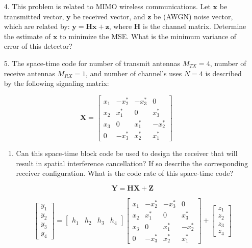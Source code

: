 \documentclass[fleqn]{article}
\makeatletter
\newenvironment{equationCenter}{\@fleqnfalse\begin{equation*}}{\end{equation*}}
\makeatother
\begin{document}
\begin{enumerate}
		\item[4.] This problem is related to MIMO wireless communications. Let $\mathbf{x}$ be transmitted vector, $\mathbf{y}$ be received vector, and $\mathbf{z}$ be (AWGN) noise vector, which are related by: $\mathbf{y}=\mathbf{Hx} + \mathbf{z}$, where $\mathbf{H}$ is the channel matrix. Determine the estimate of $\mathbf{x}$ to minimize the MSE. What is the minimum variance of error of this detector?
		
		\item[5.] The space-time code for number of transmit antennas $M_{TX}=4$, number of receive antennas $M_{RX}=1$, and number of channel's uses $N=4$ is described by the following signaling matrix:
		
		\begin{equationCenter}
			\mathbf{X} = \begin{bmatrix}
				x_1 & -x_2^* & -x_3^* &  0 \\ 
				x_2 &  x_1^* &  0     &  x_3^* \\
				x_3 &  0     &  x_1^* & -x_2^* \\
				0   & -x_3^* &  x_2^* &  x_1^*
			\end{bmatrix}
		\end{equationCenter}
		
		\begin{enumerate}
			\item Can this space-time block code be used to design the receiver that will result in spatial interference cancellation? If so describe the corresponding receiver configuration. What is the code rate of this space-time code?
			
			\begin{equation*}
				\mathbf{Y} = \mathbf{H}\mathbf{X} + \mathbf{Z}
			\end{equation*}
			
			\begin{equation*}
				\begin{bmatrix}
					y_1 \\ y_2 \\ y_3 \\ y_4
				\end{bmatrix} = \begin{bmatrix}
					h_1 & h_2 & h_3 & h_4
				\end{bmatrix}\begin{bmatrix}
					x_1 & -x_2^* & -x_3^* &  0 \\ 
					x_2 &  x_1^* &  0     &  x_3^* \\
					x_3 &  0     &  x_1^* & -x_2^* \\
					0   & -x_3^* &  x_2^* &  x_1^*
				\end{bmatrix} + \begin{bmatrix}
					z_1 \\ z_2 \\ z_3 \\ z_4
				\end{bmatrix}
			\end{equation*}
			

\end{enumerate}
\end{enumerate}
\end{document}
